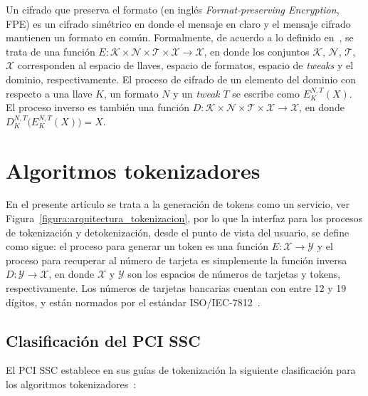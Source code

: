 \documentclass[conference]{IEEEtran}
\begin{document}
  Un cifrado que preserva el formato (en inglés \textit{Format-preserving
  Encryption}, FPE) es un cifrado simétrico en donde el mensaje en claro y el
  mensaje cifrado mantienen un formato en común. Formalmente, de acuerdo a lo
  definido en~\cite{DBLP:conf/sacrypt/BellareRRS09}, se trata de una función $
  E: \mathcal{K} \times \mathcal{N} \times \mathcal{T} \times \mathcal{X}
  \rightarrow \mathcal{X} $, en donde los conjuntos $ \mathcal{K} $, $
  \mathcal{N} $, $ \mathcal{T} $, $ \mathcal{X} $ corresponden al espacio de
  llaves, espacio de formatos, espacio de \textit{tweaks} y el dominio,
  respectivamente. El proceso de cifrado de un elemento del dominio con respecto
  a una llave $ K $, un formato $ N $ y un \textit{tweak} $ T $ se escribe como
  $ E_K^{N,T}(X) $. El proceso inverso es también una función $ D: \mathcal{K}
  \times \mathcal{N} \times \mathcal{T} \times \mathcal{X} \rightarrow
  \mathcal{X} $, en donde $ D_K^{N,T}\big( E_K^{N,T}(X) \big) = X $.

  \section{Algoritmos tokenizadores}
  \label{sec:algoritmos}

  En el presente artículo se trata a la generación de tokens como un servicio,
  ver Figura~\ref{figura:arquitectura_tokenizacion}, por lo que la interfaz para
  los procesos de tokenización y detokenización, desde el punto de vista del
  usuario, se define como sigue:  el proceso para generar un token es una
  función $ E: \mathcal{X} \rightarrow \mathcal{Y} $ y el proceso para recuperar
  al número de tarjeta es simplemente la función inversa $ D: \mathcal{Y}
  \rightarrow \mathcal{X} $, en donde $ \mathcal{X} $ y $ \mathcal{Y}$ son los
  espacios de números de tarjetas y tokens, respectivamente. Los números de
  tarjetas bancarias cuentan con entre 12 y 19 dígitos, y están normados por el
  estándar ISO/IEC-7812~\cite{iso_7812}.

  \subsection{Clasificación del PCI SSC} \label{sec:clasificacion}

  El PCI SSC establece en sus guías de tokenización la siguiente clasificación
  para los algoritmos tokenizadores~\cite{pci_tokens}:
\end{document}

